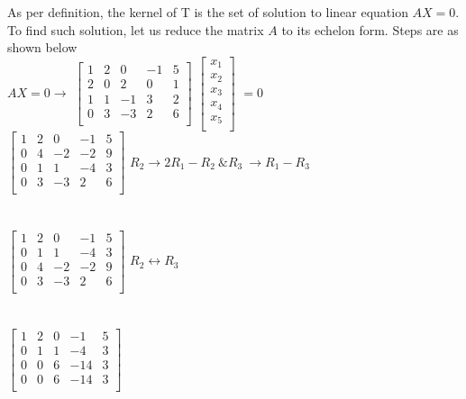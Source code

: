 \documentclass[12pt]{article}
\newcommand\tab[1][1cm]{\hspace*{#1}}
\begin{document}
\tab As per definition, the kernel of T is the set of solution to linear equation $AX=0$. To find such solution, let us reduce the matrix $A$ to its echelon form. Steps are as shown below\\
\textnormal{$AX=0 \rightarrow $}
 $\left[ \begin{array}{ccccc}
  1 & 2 & 0 & -1 & 5\\
  2 & 0 & 2 & 0 & 1\\
  1 & 1 & -1 & 3 & 2\\
  0 & 3 & -3 & 2 & 6\\
  \end{array} \right]$
  $\left[ \begin{array}{c}
  x_1 \\ 
  x_2 \\
  x_3 \\
  x_4 \\
  x_5 \\
  \end{array} \right]$
	$=0$ 
\\
 $\left[ \begin{array}{ccccc}
  1 & 2 & 0 & -1 & 5\\
  0 & 4 & -2 & -2 & 9\\
  0 & 1 & 1 & -4 & 3\\
  0 & 3 & -3 & 2 & 6\\
  \end{array} \right]$
\textnormal{$R_2 \rightarrow 2R_1-R_2 \ \& R_3 \  \rightarrow R_1 - R_3$\\}
\\ \\
 $\left[ \begin{array}{ccccc}
  1 & 2 & 0 & -1 & 5\\
  0 & 1 & 1 & -4 & 3\\
  0 & 4 & -2 & -2 & 9\\
  0 & 3 & -3 & 2 & 6\\
  \end{array} \right]$
\textnormal{$R_2 \leftrightarrow R_3$\\}
\\ \\
 $\left[ \begin{array}{ccccc}
  1 & 2 & 0 & -1 & 5\\
  0 & 1 & 1 & -4 & 3\\
  0 & 0 & 6 & -14 & 3\\
  0 & 0 & 6 & -14 & 3\\
  \end{array} \right]$
\end{document}
